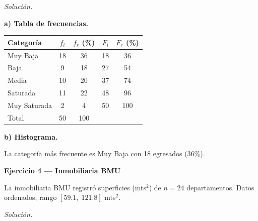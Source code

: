 \documentclass[12pt,letterpaper]{article}
\begin{document}
\medskip
\textit{Solución.}

\textbf{a) Tabla de frecuencias.}

\begin{center}
\begin{tabular}{lcccc}
\hline
Categoría    & $f_i$ & $f_{r}$ (\%) & $F_i$ & $F_{r}$ (\%) \\
\hline
Muy Baja     & 18 & 36 & 18 &  36 \\
Baja         &  9 & 18 & 27 &  54 \\
Media        & 10 & 20 & 37 &  74 \\
Saturada     & 11 & 22 & 48 &  96 \\
Muy Saturada &  2 &  4 & 50 & 100 \\
\hline
Total        & 50 & 100 & & \\
\hline
\end{tabular}
\end{center}

\medskip
\textbf{b) Histograma.}

\begin{center}
\end{center}

La categoría más frecuente es Muy Baja con 18 egresados (36\%).

\bigskip

\textbf{Ejercicio 4 — Inmobiliaria BMU}

\medskip
La inmobiliaria BMU registró superficies (mts$^2$) de $n=24$ departamentos.
Datos ordenados, rango $[59.1,\;121.8]$ mts$^2$.

\medskip
\textit{Solución.}
\end{document}
